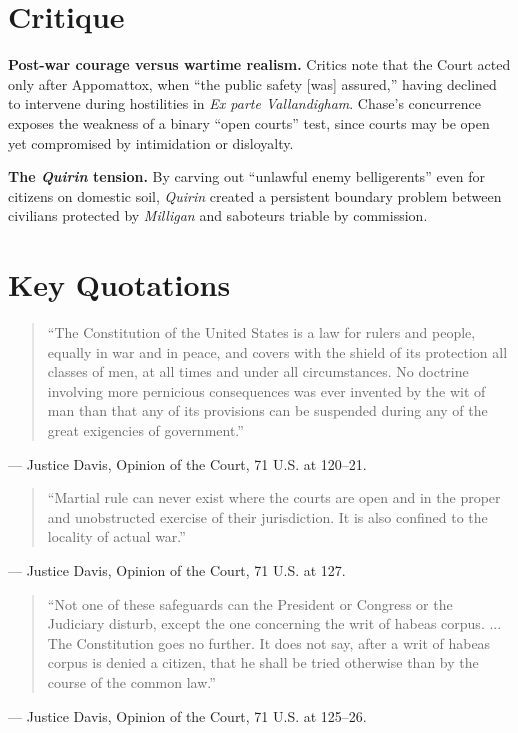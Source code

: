 \documentclass[12pt]{article}
\begin{document}
\section{Critique}

\textbf{Post-war courage versus wartime realism.} Critics note that the Court acted only after Appomattox, when ``the public safety [was] assured,'' having declined to intervene during hostilities in \textit{Ex parte Vallandigham}. Chase's concurrence exposes the weakness of a binary ``open courts'' test, since courts may be open yet compromised by intimidation or disloyalty.

\textbf{The \textit{Quirin} tension.} By carving out ``unlawful enemy belligerents'' even for citizens on domestic soil, \textit{Quirin} created a persistent boundary problem between civilians protected by \textit{Milligan} and saboteurs triable by commission.

\section{Key Quotations}

\begin{quote}
``The Constitution of the United States is a law for rulers and people, equally in war and in peace, and covers with the shield of its protection all classes of men, at all times and under all circumstances. No doctrine involving more pernicious consequences was ever invented by the wit of man than that any of its provisions can be suspended during any of the great exigencies of government.''
\end{quote}
\noindent --- Justice Davis, Opinion of the Court, 71 U.S. at 120--21.

\begin{quote}
``Martial rule can never exist where the courts are open and in the proper and unobstructed exercise of their jurisdiction. It is also confined to the locality of actual war.''
\end{quote}
\noindent --- Justice Davis, Opinion of the Court, 71 U.S. at 127.

\begin{quote}
``Not one of these safeguards can the President or Congress or the Judiciary disturb, except the one concerning the writ of habeas corpus. ... The Constitution goes no further. It does not say, after a writ of habeas corpus is denied a citizen, that he shall be tried otherwise than by the course of the common law.''
\end{quote}
\noindent --- Justice Davis, Opinion of the Court, 71 U.S. at 125--26.
\end{document}
